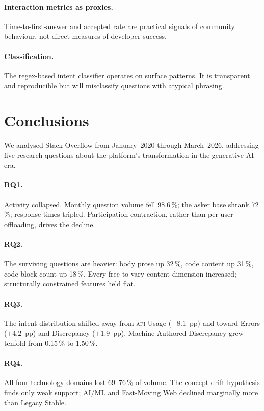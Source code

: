 \documentclass[sigconf]{acmart}
\begin{document}
\paragraph{Interaction metrics as proxies.}
Time-to-first-answer and accepted rate
are practical signals of community behaviour,
not direct measures of developer success.

\paragraph{Classification.}
The regex-based intent classifier
operates on surface patterns.
It is transparent and reproducible
but will misclassify questions
with atypical phrasing.

\section{Conclusions}
\label{sec:conclusions}

We analysed Stack Overflow
from January~2020 through March~2026,
addressing five research questions
about the platform's transformation
in the generative AI era.

\paragraph{RQ1.}
Activity collapsed.
Monthly question volume fell 98.6\,\%;
the asker base shrank 72\,\%;
response times tripled.
Participation contraction,
rather than per-user offloading,
drives the decline.

\paragraph{RQ2.}
The surviving questions are heavier:
body prose up 32\,\%,
code content up 31\,\%,
code-block count up 18\,\%.
Every free-to-vary content dimension increased;
structurally constrained features held flat.

\paragraph{RQ3.}
The intent distribution shifted
away from \textsc{api} Usage ($-8.1$~pp)
and toward Errors ($+4.2$~pp)
and Discrepancy ($+1.9$~pp).
Machine-Authored Discrepancy grew tenfold
from 0.15\,\% to 1.50\,\%.

\paragraph{RQ4.}
All four technology domains
lost 69--76\,\% of volume.
The concept-drift hypothesis
finds only weak support;
AI/ML and Fast-Moving Web
declined marginally more
than Legacy Stable.
\end{document}
